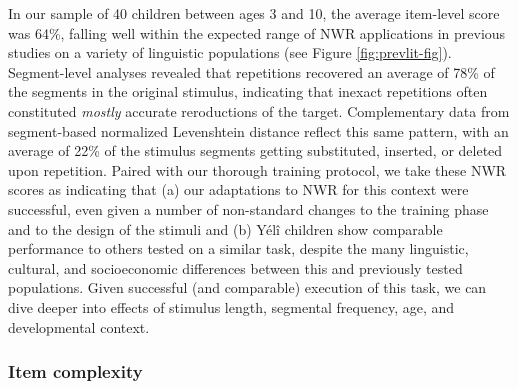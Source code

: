 \documentclass[english,,man,floatsintext]{apa6}
\begin{document}
In our sample of 40 children between ages 3 and 10, the average
item-level score was 64\%, falling well within the expected range of NWR
applications in previous studies on a variety of linguistic populations
(see Figure \ref{fig:prevlit-fig}). Segment-level analyses revealed that
repetitions recovered an average of 78\% of the segments in the original
stimulus, indicating that inexact repetitions often constituted
\emph{mostly} accurate reroductions of the target. Complementary data
from segment-based normalized Levenshtein distance reflect this same
pattern, with an average of 22\% of the stimulus segments getting
substituted, inserted, or deleted upon repetition. Paired with our
thorough training protocol, we take these NWR scores as indicating that
(a) our adaptations to NWR for this context were successful, even given
a number of non-standard changes to the training phase and to the design
of the stimuli and (b) Yélî children show comparable performance to
others tested on a similar task, despite the many linguistic, cultural,
and socioeconomic differences between this and previously tested
populations. Given successful (and comparable) execution of this task,
we can dive deeper into effects of stimulus length, segmental frequency,
age, and developmental context.

\subsubsection{Item complexity}\label{item-complexity}
\end{document}

